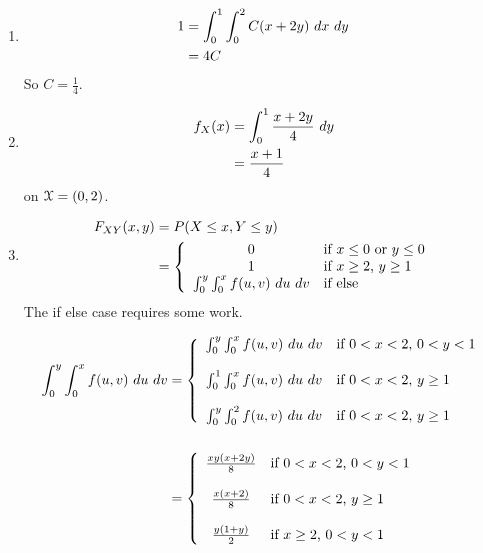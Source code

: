 \documentclass[12pt,letterpaper,reqno]{amsart}
\numberwithin{equation}{subsection}
\begin{document}
\begin{enumerate}[label=(\alph*),leftmargin=*]
    \item 
    
    \begin{align*}
        1 &= \myint{\myint{C(x+2y)}{x}{0}{2}}{y}{0}{1} \\
          &= 4C
    \end{align*}
    So $C = \frac{1}{4}$.
    
    \item 
    
    \begin{align*}
        \fun{f_X}{x} &= \myint{\frac{x+2y}{4}}{y}{0}{1} \\
                     &= \frac{x+1}{4}
    \end{align*}
    on $\mycal{X} = (0,2)$.
    
    \item
    
    \begin{align*}
        \fun{F_{XY}}{x,y} &= \fun{P}{X \leq x, Y \leq y} \\
        &= \left\{ \begin{array}{cl}
             0 & \mbox{if $x \leq 0$ or $y \leq 0$} \\
             1 & \mbox{if $x \geq 2$, $y \geq 1$} \\
             \myint{\myint{f(u,v)}{u}{0}{x}}{v}{0}{y} & \mbox{if else}
        \end{array} \right.
    \end{align*}
    The if else case requires some work.
    
    \begin{align*}
         \myint{\myint{f(u,v)}{u}{0}{x}}{v}{0}{y}
         &= \left\{ \begin{array}{cl}
             \myint{\myint{f(u,v)}{u}{0}{x}}{v}{0}{y}  & \mbox{if $0 < x < 2$, $0 < y < 1$} \\
             \\
             \myint{\myint{f(u,v)}{u}{0}{x}}{v}{0}{1}  & \mbox{if $0 < x < 2$, $y \geq 1$} \\
              \\
             \myint{\myint{f(u,v)}{u}{0}{2}}{v}{0}{y}  & \mbox{if $0 < x < 2$, $y \geq 1$} \\
         \end{array} \right. \\
         \\
         &= \left\{ \begin{array}{cl}
             \frac{xy(x+2y)}{8}  & \mbox{if $0 < x < 2$, $0 < y < 1$} \\
             \\
             \frac{x(x+2)}{8}  & \mbox{if $0 < x < 2$, $y \geq 1$} \\
              \\
             \frac{y(1+y)}{2}   & \mbox{if $x \geq 2$, $0 < y < 1$} \\
         \end{array} \right. 
    \end{align*}
    

\end{enumerate}
\end{document}
